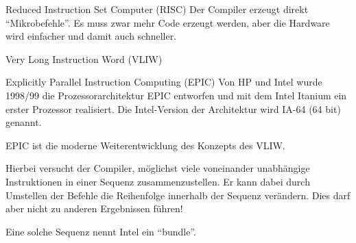\begin{defi}{Reduced Instruction Set Computer (RISC)}
    Der Compiler erzeugt direkt \enquote{Mikrobefehle}. 
    Es muss zwar mehr Code erzeugt werden, 
    aber die Hardware wird einfacher und damit auch schneller.
\end{defi}

\begin{defi}{Very Long Instruction Word (VLIW)}
\end{defi}

\begin{defi}{Explicitly Parallel Instruction Computing (EPIC)}
    Von HP und Intel wurde 1998/99 die Prozessorarchitektur EPIC entworfen 
    und mit dem Intel Itanium ein erster Prozessor realisiert. 
    Die Intel-Version der Architektur wird IA-64 (64 bit) genannt.
    
    EPIC ist die moderne Weiterentwicklung des Konzepts des VLIW.
    
    Hierbei versucht der Compiler, 
    möglichst viele voneinander unabhängige Instruktionen in einer Sequenz zusammenzustellen. 
    Er kann dabei durch Umstellen der Befehle die Reihenfolge innerhalb der Sequenz verändern. 
    Dies darf aber nicht zu anderen Ergebnissen führen!
    
    Eine solche Sequenz nennt Intel ein “bundle”.
\end{defi}